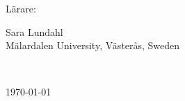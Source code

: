 \begin{center}
\begin{flushleft}
			\Large \hspace{0.04cm} Lärare: \begin{minipage}[t]{0,7\textwidth}\Large Sara Lundahl\\
            \large Mälardalen University, \large Västerås, Sweden \end{minipage} \\[0.5cm]
			
\end{flushleft}

              \vspace*{\fill}
                    \large \today		%

\end{center}